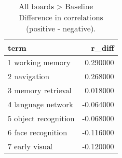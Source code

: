 \begin{table}
\caption{All boards > Baseline — Difference in correlations (positive - negative).}
\label{tab:All boards > Baseline_diff}
\begin{tabular}{lr}
\toprule
term & r\_diff \\
\midrule
1 working memory & 0.290000 \\
2 navigation & 0.268000 \\
3 memory retrieval & 0.018000 \\
4 language network & -0.064000 \\
5 object recognition & -0.068000 \\
6 face recognition & -0.116000 \\
7 early visual & -0.120000 \\
\bottomrule
\end{tabular}
\end{table}
